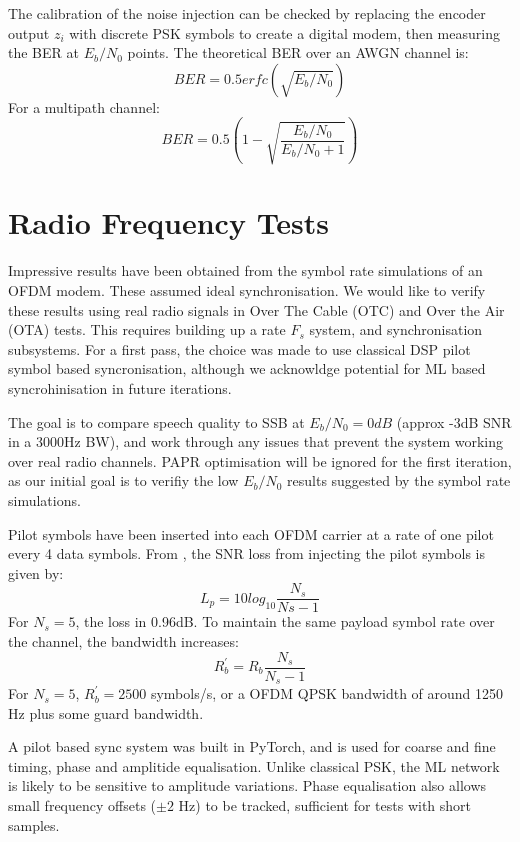 \documentclass{article}
\begin{document}
The calibration of the noise injection can be checked by replacing the encoder output $z_i$ with discrete PSK symbols to create a digital modem, then measuring the BER at $E_b/N_0$ points. The theoretical BER over an AWGN channel is:
\begin{equation}
\label{eq:ber_awgn}
BER = 0.5erfc(\sqrt{E_b/N_0})
\end{equation}
For a multipath channel:
\begin{equation}
\label{eq:ber_multipath}
BER = 0.5 \left(1-\sqrt{\frac{E_b/N_0}{E_b/N_0+1}} \right)
\end{equation}


\section{Radio Frequency Tests}

Impressive results have been obtained from the symbol rate simulations of an OFDM modem.  These assumed ideal synchronisation.  We would like to verify these results using real radio signals in Over The Cable (OTC) and Over the Air (OTA) tests.  This requires building up a rate $F_s$ system, and synchronisation subsystems.  For a first pass, the choice was made to use classical DSP pilot symbol based syncronisation, although we acknowldge potential for ML based syncrohinisation in future iterations.

The goal is to compare speech quality to SSB at $E_b/N_0=0dB$ (approx -3dB SNR in a 3000Hz BW), and work through any issues that prevent the system working over real radio channels.  PAPR optimisation will be ignored for the first iteration, as our initial goal is to verifiy the low $E_b/N_0$ results suggested by the symbol rate simulations.

Pilot symbols have been inserted into each OFDM carrier at a rate of one pilot every 4 data symbols.  From \cite{freedv_low}, the SNR loss from injecting the pilot symbols is given by:
\begin{equation}
L_p = 10log_{10}\frac{N_s}{Ns-1}
\end{equation}
For $N_s=5$, the loss in 0.96dB.  To maintain the same payload symbol rate over the channel, the bandwidth increases:
\begin{equation}
R^\prime_b = R_b\frac{N_s}{N_s-1}
\end{equation}
For $N_s=5$, $R^\prime_b=2500$ symbols/s, or a OFDM QPSK bandwidth of around 1250 Hz plus some guard bandwidth.

A pilot based sync system was built in PyTorch, and is used for coarse and fine timing, phase and amplitide equalisation.  Unlike classical PSK, the ML network is likely to be sensitive to amplitude variations.  Phase equalisation also allows small frequency offsets ($\pm2$ Hz) to be tracked, sufficient for tests with short samples.
\end{document}
